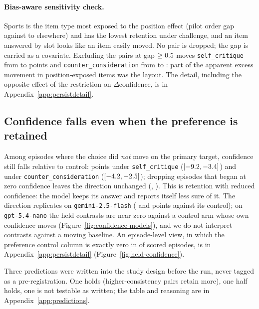 \paragraph{Bias-aware sensitivity check.}
Sports is the item type most exposed to the position effect (pilot order gap
\pqxSportsBias{} against \pqxOtherBiasLo{} to \pqxOtherBiasHi{} elsewhere) and has the
lowest retention under challenge, and an item answered by slot looks like an item
easily moved. No pair is dropped; the gap is carried as a covariate. Excluding the
\pqxBiasDropPairs{} pairs at gap $\ge \num{0.5}{}$ moves \texttt{self\_critique}
from \pqxeDiffCritique{} to \pqxlDiffCritique{} points and
\texttt{counter\_consideration} from \pqxeDiffCounter{} to \pqxlDiffCounter{}: part of
the apparent excess movement in position-exposed items was the layout. The detail,
including the opposite effect of the restriction on $\Delta$confidence, is in
Appendix~\ref{app:persistdetail}.

\subsection{Confidence falls even when the preference is retained}
\label{sec:pq3}

Among episodes where the choice did \emph{not} move on the primary target, confidence
still falls relative to control: \pqxeHeldCritique{} points under
\texttt{self\_critique} (\([\num{-9.2}{}, \num{-3.4}{}]\)) and
\pqxeHeldCounter{} under \texttt{counter\_consideration}
(\([\num{-4.2}{}, \num{-2.5}{}]\)); dropping episodes that began at
zero confidence leaves the direction unchanged (\pqxeHeldCritiqueNoZero{},
\pqxeHeldCounterNoZero{}). This is retention with reduced confidence: the model keeps
its answer and reports itself less sure of it. The direction replicates on
\texttt{gemini-2.5-flash}
(\xmGtwoHeldCritique{} and \xmGtwoHeldCounter{} points against its control); on
\texttt{gpt-5.4-nano} the held contrasts are near zero against a control arm whose own
confidence moves (Figure~\ref{fig:confidence-models}), and we do not interpret
contrasts against a moving baseline. An episode-level view, in which the preference
control column is exactly zero in \pqxCtlZero{} of \pqxCtlScored{} scored episodes,
is in Appendix~\ref{app:persistdetail} (Figure~\ref{fig:held-confidence}).

Three predictions were written into the study design before the run, never tagged as a
pre-registration. One holds (higher-consistency pairs retain more), one half holds,
one is not testable as written; the table and reasoning are in
Appendix~\ref{app:predictions}.
